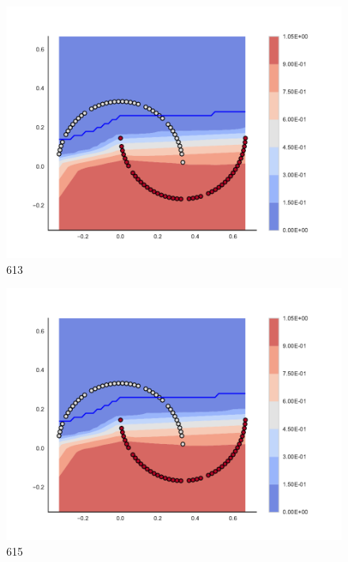 \begin{subfigure}[b]{0.09\textwidth}
    \includegraphics[clip, trim=2.35cm 1.75cm 4.5cm 0cm,width=\textwidth]{img/convergence/613.pdf}
    \caption{613}
    \label{fig:convergence_613}
\end{subfigure}
%
\begin{subfigure}[b]{0.09\textwidth}
    \includegraphics[clip, trim=2.35cm 1.75cm 4.5cm 0cm,width=\textwidth]{img/convergence/615.pdf}
    \caption{615}
    \label{fig:convergence_615}
\end{subfigure}
%
